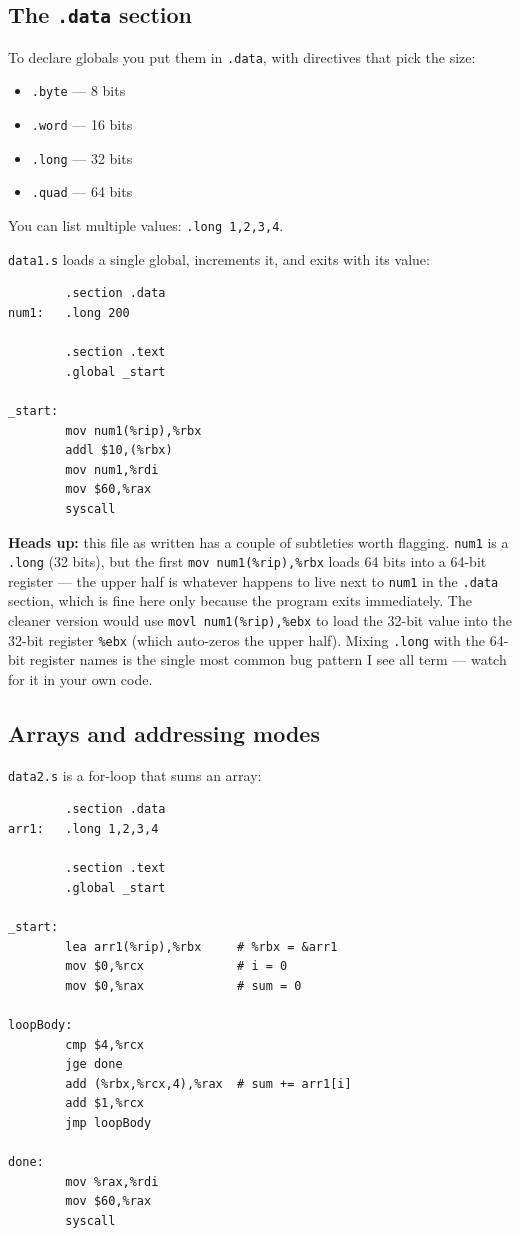 \documentclass[11pt]{article}
\begin{document}
\subsection*{The \texttt{.data} section}

To declare globals you put them in \texttt{.data}, with directives
that pick the size:
\begin{itemize}
  \item \texttt{.byte} --- 8 bits
  \item \texttt{.word} --- 16 bits
  \item \texttt{.long} --- 32 bits
  \item \texttt{.quad} --- 64 bits
\end{itemize}
You can list multiple values: \texttt{.long 1,2,3,4}.

\texttt{data1.s} loads a single global, increments it, and exits
with its value:

\begin{lstlisting}
        .section .data
num1:   .long 200

        .section .text
        .global _start

_start:
        mov num1(%rip),%rbx
        addl $10,(%rbx)
        mov num1,%rdi
        mov $60,%rax
        syscall
\end{lstlisting}

\textbf{Heads up:} this file as written has a couple of subtleties
worth flagging. \texttt{num1} is a \texttt{.long} (32 bits), but the
first \texttt{mov num1(\%rip),\%rbx} loads 64 bits into a 64-bit
register --- the upper half is whatever happens to live next to
\texttt{num1} in the \texttt{.data} section, which is fine here only
because the program exits immediately. The cleaner version would use
\texttt{movl num1(\%rip),\%ebx} to load the 32-bit value into the
32-bit register \texttt{\%ebx} (which auto-zeros the upper half).
Mixing \texttt{.long} with the 64-bit register names is the single
most common bug pattern I see all term --- watch for it in your own
code.

\subsection*{Arrays and addressing modes}

\texttt{data2.s} is a for-loop that sums an array:

\begin{lstlisting}
        .section .data
arr1:   .long 1,2,3,4

        .section .text
        .global _start

_start:
        lea arr1(%rip),%rbx     # %rbx = &arr1
        mov $0,%rcx             # i = 0
        mov $0,%rax             # sum = 0

loopBody:
        cmp $4,%rcx
        jge done
        add (%rbx,%rcx,4),%rax  # sum += arr1[i]
        add $1,%rcx
        jmp loopBody

done:
        mov %rax,%rdi
        mov $60,%rax
        syscall
\end{lstlisting}
\end{document}
